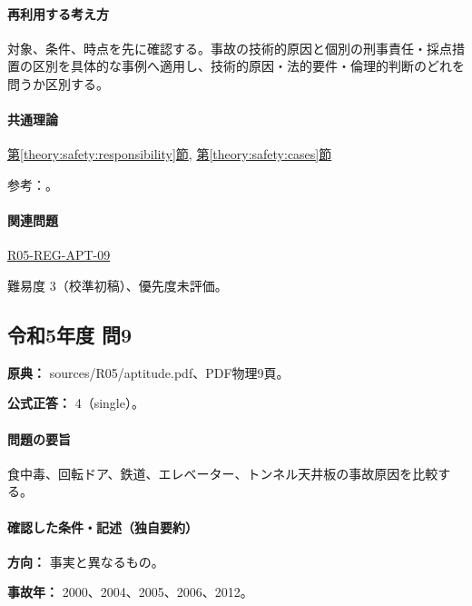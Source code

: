 \paragraph{再利用する考え方} 対象、条件、時点を先に確認する。事故の技術的原因と個別の刑事責任・採点措置の区別を具体的な事例へ適用し、技術的原因・法的要件・倫理的判断のどれを問うか区別する。

\paragraph{共通理論} \hyperref[theory:safety:responsibility]{第\ref*{theory:safety:responsibility}節}, \hyperref[theory:safety:cases]{第\ref*{theory:safety:cases}節}

\par 参考：\cite{court_jr2017,jtsb_fukuchiyama2007,mhlw_milk2002,mlit_sasago2013}。

\paragraph{関連問題} \hyperref[q:r05-reg-apt-09]{R05-REG-APT-09}

\par 難易度 3（校準初稿）、優先度未評価。

\subsection{令和5年度 問9}
\label{q:r05-reg-apt-09}

\noindent\textbf{原典：} sources/R05/aptitude.pdf、PDF物理9頁。

\textbf{公式正答：} 4（single）。

\paragraph{問題の要旨} 食中毒、回転ドア、鉄道、エレベーター、トンネル天井板の事故原因を比較する。

\paragraph{確認した条件・記述（独自要約）}\mbox{}\par

\noindent\textbf{方向：} 事実と異なるもの。\par

\noindent\textbf{事故年：} 2000、2004、2005、2006、2012。\par

